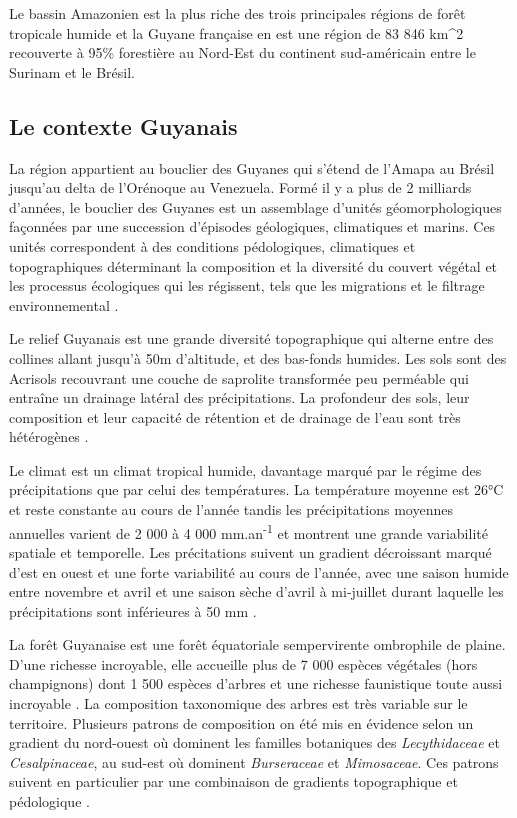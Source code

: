 \documentclass[
  11pt,
  french,
  A4paper,
  extrafontsizes,onecolumn,openright
  ]{memoir}
\begin{document}
Le bassin Amazonien est la plus riche des trois principales régions de
forêt tropicale humide \autocite{Gentry1988} et la Guyane française en
est une région de 83 846 km\^{}2 recouverte à 95\% forestière au
Nord-Est du continent sud-américain entre le Surinam et le Brésil.

\subsection{Le contexte Guyanais}\label{le-contexte-guyanais}

La région appartient au bouclier des Guyanes qui s'étend de l'Amapa au
Brésil jusqu'au delta de l'Orénoque au Venezuela. Formé il y a plus de 2
milliards d'années, le bouclier des Guyanes est un assemblage d'unités
géomorphologiques façonnées par une succession d'épisodes géologiques,
climatiques et marins. Ces unités correspondent à des conditions
pédologiques, climatiques et topographiques déterminant la composition
et la diversité du couvert végétal et les processus écologiques qui les
régissent, tels que les migrations et le filtrage environnemental
\autocite{Guitet2015}.

Le relief Guyanais est une grande diversité topographique qui alterne
entre des collines allant jusqu'à 50m d'altitude, et des bas-fonds
humides. Les sols sont des Acrisols recouvrant une couche de saprolite
transformée peu perméable qui entraîne un drainage latéral des
précipitations. La profondeur des sols, leur composition et leur
capacité de rétention et de drainage de l'eau sont très hétérogènes
\autocites{Ferry2010}{Robert2003}.

Le climat est un climat tropical humide, davantage marqué par le régime
des précipitations que par celui des températures. La température
moyenne est 26°C et reste constante au cours de l'année tandis les
précipitations moyennes annuelles varient de 2 000 à 4 000
mm.an\textsuperscript{-1} et montrent une grande variabilité spatiale et
temporelle. Les précitations suivent un gradient décroissant marqué
d'est en ouest et une forte variabilité au cours de l'année, avec une
saison humide entre novembre et avril et une saison sèche d'avril à
mi-juillet durant laquelle les précipitations sont inférieures à 50 mm
\autocite{Wagner2011}.

La forêt Guyanaise est une forêt équatoriale sempervirente ombrophile de
plaine. D'une richesse incroyable, elle accueille plus de 7 000 espèces
végétales (hors champignons) dont 1 500 espèces d'arbres et une richesse
faunistique toute aussi incroyable \autocite{DeNoter2008}. La
composition taxonomique des arbres est très variable sur le territoire.
Plusieurs patrons de composition on été mis en évidence selon un
gradient du nord-ouest où dominent les familles botaniques des
\emph{Lecythidaceae} et \emph{Cesalpinaceae}, au sud-est où dominent
\emph{Burseraceae} et \emph{Mimosaceae}. Ces patrons suivent en
particulier par une combinaison de gradients topographique et
pédologique \autocites{Sabatier1989}[ cf
Toto]{Sabatier1997}{Guitet2015}.
\end{document}
